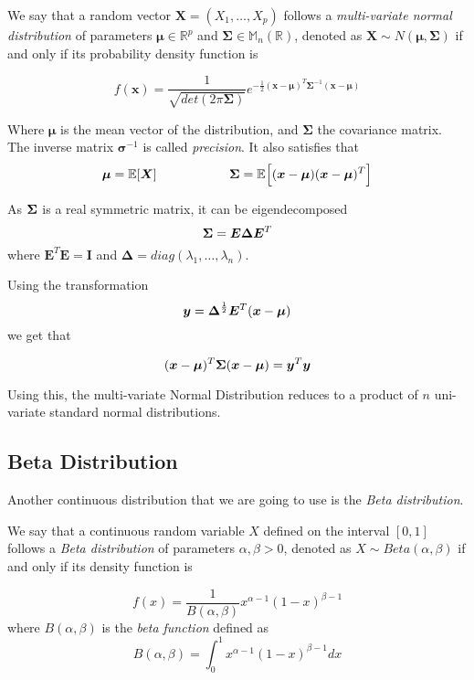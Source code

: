 \begin{definition}
We say that a random vector \(\bm{X} = (X_1,\dots,X_p)\) follows a \emph{multi-variate normal
  distribution} of parameters \(\bm{\mu} \in \mathbb{R}^p\) and \(\bm{\Sigma}
\in \mathbb{M}_n(\mathbb{R})\), denoted as \(\bm{X} \sim N(\bm{\mu},
\bm{\Sigma})\) if and only if its probability density function is

\[
  f(\bm{x}) = \frac{1}{\sqrt{det(2\pi \bm{\Sigma})}}e^{-\frac{1}{2}(\bm{x} - \bm{\mu})^T\bm{\Sigma}^{-1}(\bm{x}-\bm{\mu})}
\]

Where \(\bm{\mu}\) is the mean vector of the distribution, and \(\bm{\Sigma}\)
the covariance matrix. The inverse matrix \(\bm{\sigma}^{-1}\) is called \emph{precision}.
It also satisfies that
\[
\bm{\mu} = \mathbb{E}[\bm{X}] \hspace{2cm} \bm{\Sigma} = \mathbb{E}_{}\Big[(\bm{x} - \bm{\mu})(\bm{x} - \bm{\mu})^T\Big]
\]

As \(\bm{\Sigma}\) is a real symmetric matrix, it can be eigendecomposed
\[
  \bm{\Sigma} = \bm{E}\bm{\Delta}\bm{E}^T
\]
where \(\bm{E}^T\bm{E} = \bm{I}\) and \(\bm{\Delta} =
diag(\lambda_1,\dots,\lambda_n)\).

Using the transformation
\[
  \bm{y} = \bm{\Delta}^{\frac{1}{2}}\bm{E}^T(\bm{x} - \bm{\mu})
\]
we get that

\[
  (\bm{x} - \bm{\mu})^T\bm{\Sigma}(\bm{x} - \bm{\mu}) = \bm{y}^T\bm{y}
\]

Using this, the multi-variate Normal Distribution reduces to a product of \(n\)
uni-variate standard normal distributions.

\end{definition}

\subsection{Beta Distribution}

Another continuous distribution that we are going to use is the \emph{Beta
  distribution}.

\begin{definition}
We say that a continuous random variable \(X\) defined on the
interval \([0,1]\) follows a \emph{Beta distribution} of parameters \(\alpha,
\beta > 0\), denoted as \(X \sim Beta(\alpha, \beta)\) if and only if its
density function is

\[
  f(x) = \frac{1}{B(\alpha, \beta)}x^{\alpha - 1}(1-x)^{\beta -1}
\]
where \(B(\alpha, \beta)\) is the \emph{beta function} defined as
\[
  B(\alpha, \beta) = \int_0^1 x^{\alpha - 1}(1-x)^{\beta -1} dx
\]
\end{definition}

